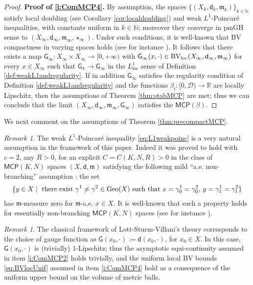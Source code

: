 \documentclass[11pt,a4paper]{article}
\theoremstyle{plain}
\theoremstyle{definition}
\theoremstyle{remark}
\newtheorem{remark}[theorem]{Remark}
\numberwithin{equation}{section}
\newcommand{\R}{\mathbb{R}} %
\newcommand{\N}{\mathbb{N}} %
\newcommand{\MCP}{\mathsf{MCP}}
\newcommand{\cD}{\mathcal{D}}
\newcommand{\loc}{\mathrm{loc}}
\newcommand{\mm}{\mathfrak m}
\newcommand{\sfd}{\mathsf d}
\newcommand{\sfG}{\mathsf G}
\begin{document}
\begin{proof}
\textbf{Proof of \ref{i:ComMCP4}.}  By assumption, the spaces $\{(X_{k}, \sfd_{k}, \mm_{k})\}_{k\in \N}$ satisfy local doubling (see Corollary \ref{cor:localdoubling}) and weak $L^{1}$-Poincar\'e inequalities, with constants uniform in $k\in \N$; moreover they converge in pmGH sense to $(X_\infty,\sfd_\infty,\mm_\infty,\star_\infty)$. Under such conditions, it is well-known that BV compactness in varying spaces holds (see for instance \cite[Thm.\@ 4.15]{KuwaeShyoiaTAMS208}). It follows that  there exists a  map $\sfG_\infty:X_{\infty}\times X_{\infty} \to [0,+\infty)$ with $\sfG_\infty(x, \cdot)\in {\rm BV_{loc}}(X_{\infty}, \sfd_\infty,\mm_\infty)$ for every $x\in X_{\infty}$ such that  $\sfG_k\to \sfG_\infty$ in the $L^1_\loc$ sense of Definition \ref{def:weakL1andregularity}. If in addition $\sfG_\infty$ satisfies the regularity condition of Definition \ref{def:weakL1andregularity} and the functions $\beta_t:[0,\cD)\to \R$ are locally Lipschitz, then the assumptions of Theorem \ref{thm:stabMCP} are met; thus we can conclude that the limit $(X_\infty,\sfd_\infty,\mm_\infty, \sfG_\infty)$ satisfies the $\MCP(\beta)$. 
\end{proof}

We next comment on the assumptions of Theorem \ref{thm:precompactMCP}. 

\begin{remark} The weak $L^{1}$-Poincar\'e inequality \eqref{eq:L1weakpoinc} is a very natural assumption in the framework of this paper. Indeed it was proved to hold with $c=2$, any $R>0$, for an explicit $C=C(K,N,R)>0$ in the class of  $\MCP(K,N)$ spaces $(X,\sfd, \mm)$ satisfying the following mild  ``a.e. non-branching'' assumption \cite[Cor.\ p.\ 28]{VRN}: the set
\begin{equation}
\{y\in X \mid \text{ there exist } \gamma^{1}\neq \gamma^{2}\in {\rm Geo}(X) \text{ such that } x=\gamma_{0}^{1}=\gamma_{0}^{2}, \, y=\gamma_{1}^{1}=\gamma_{1}^{2}\}
\end{equation}
has $\mm$-measure zero for $\mm$-a.e. $x\in X$. It is well-known that such a property holds for essentially non-branching $\MCP(K,N)$ spaces (see for instance \cite[Rmk.\ 2.6]{CavaMondAPDE}).
\end{remark}


\begin{remark}The classical framework of Lott-Sturm-Villani's theory corresponds to the choice of gauge function as $\sfG(x_{0}, \cdot):=\sfd(x_{0}, \cdot)$, for  $x_{0}\in X$. In this case, $\sfG(x_{0}, \cdot)$ is (trivially) 1-Lipschitz; thus the asymptotic equi-continuity assumed in item \ref{i:ComMCP2} holds trivially,   and the uniform local BV bounds \eqref{eq:BVlocUnif} assumed in  item \ref{i:ComMCP4} hold as a consequence of the uniform upper bound on the volume of metric balls. 
\end{remark}
\end{document}
